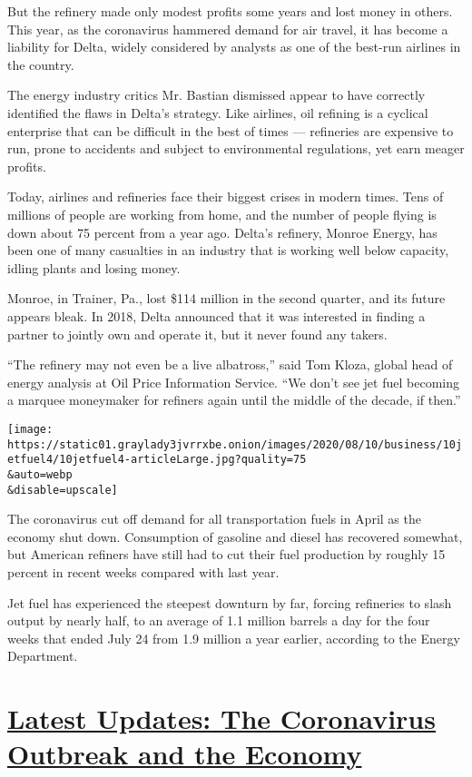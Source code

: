 But the refinery made only modest profits some years and lost money in
others. This year, as the coronavirus hammered demand for air travel, it
has become a liability for Delta, widely considered by analysts as one
of the best-run airlines in the country.

The energy industry critics Mr. Bastian dismissed appear to have
correctly identified the flaws in Delta's strategy. Like airlines, oil
refining is a cyclical enterprise that can be difficult in the best of
times --- refineries are expensive to run, prone to accidents and
subject to environmental regulations, yet earn meager profits.

Today, airlines and refineries face their biggest crises in modern
times. Tens of millions of people are working from home, and the number
of people flying is down about 75 percent from a year ago. Delta's
refinery, Monroe Energy, has been one of many casualties in an industry
that is working well below capacity, idling plants and losing money.

Monroe, in Trainer, Pa., lost \$114 million in the second quarter, and
its future appears bleak. In 2018, Delta announced that it was
interested in finding a partner to jointly own and operate it, but it
never found any takers.

``The refinery may not even be a live albatross,'' said Tom Kloza,
global head of energy analysis at Oil Price Information Service. ``We
don't see jet fuel becoming a marquee moneymaker for refiners again
until the middle of the decade, if then.''

\texttt{[image: https://static01.graylady3jvrrxbe.onion/images/2020/08/10/business/10jetfuel4/10jetfuel4-articleLarge.jpg?quality=75\\\&auto=webp\\\&disable=upscale]}

The coronavirus cut off demand for all transportation fuels in April as
the economy shut down. Consumption of gasoline and diesel has recovered
somewhat, but American refiners have still had to cut their fuel
production by roughly 15 percent in recent weeks compared with last
year.

Jet fuel has experienced the steepest downturn by far, forcing
refineries to slash output by nearly half, to an average of 1.1 million
barrels a day for the four weeks that ended July 24 from 1.9 million a
year earlier, according to the Energy Department.

\hypertarget{latest-updates-the-coronavirus-outbreak-and-the-economy}{%
\section{\texorpdfstring{\href{https://www.nytimes3xbfgragh.onion/live/2020/08/20/business/stock-market-today-coronavirus?action=click\&pgtype=Article\&state=default\&region=MAIN_CONTENT_1\&context=storylines_live_updates}{Latest
Updates: The Coronavirus Outbreak and the
Economy}}{Latest Updates: The Coronavirus Outbreak and the Economy}}\label{latest-updates-the-coronavirus-outbreak-and-the-economy}}

